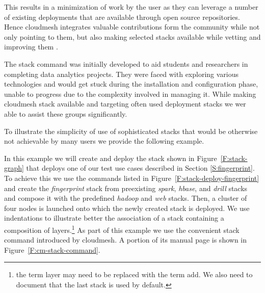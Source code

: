 This results in a minimization of work by the user as
they can leverage a number of existing deployments that are
available through open source repositories. Hence cloudmesh integrates
valuable contributions form the community while not only pointing to
them, but also making selected stacks available while vetting and
improving them \cite{www-cm-stacks}.


The stack command was initially developed to aid students and
researchers in completing data analytics projects.  They were faced
with exploring various technologies and would get stuck during the
installation and configuration phase, unable to progress due to the
complexity involved in managing it. While making cloudmesh stack
available and targeting often used deployment stacks we wer able to
assist these groups significantly.  

To illustrate the simplicity of use of sophisticated stacks that would
be otherwise not achievable by many users we provide the following example.

In this example we will create and deploy the stack shown in
Figure~\ref{F:stack-graph} that deploys one of our test use cases
described in Section \ref{S:fingerprint}. To achieve this we use the
commands listed in Figure~\ref{F:stack-deploy-fingerprint} and create
the {\it fingerprint} stack from preexisting {\it spark}, {\it hbase},
and {\it drill} stacks and compose it with the predefined {\it hadoop}
and {\it web} stacks. Then, a cluster of four nodes is launched onto
which the newly created stack is deployed. We use indentations to
illustrate better the association of a stack containing a composition
of layers.\footnote{the term layer may need to be replaced with the
  term add. We also need to document that the last stack is used by
  default.}  As part of this example we use the convenient stack
command introduced by cloudmesh. A portion of its manual page is shown
in Figure~\ref{F:cm-stack-command}.

